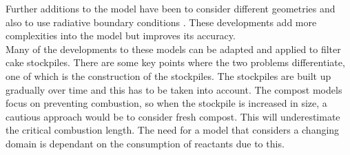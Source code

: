 Further additions to the model have been to consider different geometries \cite{luang11a} and also to use radiative boundary conditions \cite{luang10d,MOR09}. These developments add more complexities into the model but improves its accuracy.\\
Many of the developments to these models can be adapted and applied to filter cake stockpiles. There are some key points where the two problems differentiate, one of which is the construction of the stockpiles. The stockpiles are built up gradually over time and this has to be taken into account. The compost models focus on preventing combustion, so when the stockpile is increased in size, a cautious approach would be to consider fresh compost. This will underestimate the critical combustion length. The need for a model that considers a changing domain is dependant on the consumption of reactants due to this.
